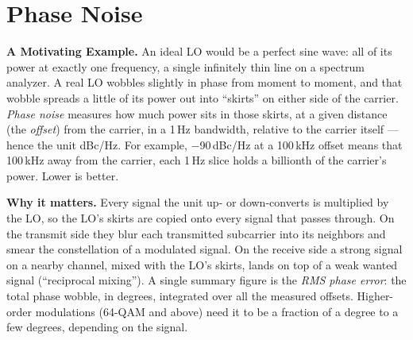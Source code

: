 \clearpage
\section{Phase Noise}
\label{sec:phase-noise}
\raggedbottom%


\textbf{A Motivating Example.} An ideal LO would be a perfect sine wave: all of its power at exactly one
frequency, a single infinitely thin line on a spectrum analyzer. A real LO wobbles slightly in phase from moment
to moment, and that wobble spreads a little of its power out into ``skirts'' on either side of the carrier.
\emph{Phase noise} measures how much power sits in those skirts, at a given distance (the \emph{offset}) from
the carrier, in a 1\,Hz bandwidth, relative to the carrier itself --- hence the unit dBc/Hz. For example,
−90\,dBc/Hz at a 100\,kHz offset means that 100\,kHz away from the carrier, each 1\,Hz slice holds a
billionth of the carrier's power. Lower is better.

\textbf{Why it matters.} Every signal the unit up- or down-converts is multiplied by the LO, so the LO's
skirts are copied onto every signal that passes through. On the transmit side they blur each transmitted
subcarrier into its neighbors and smear the constellation of a modulated signal. On the receive side a strong
signal on a nearby channel, mixed with the LO's skirts, lands on top of a weak wanted signal (``reciprocal
mixing''). A single summary figure is the \emph{RMS phase error}: the total phase wobble, in degrees, integrated
over all the measured offsets. Higher-order modulations (64-QAM and above) need it to be a fraction of a
degree to a few degrees, depending on the signal.

